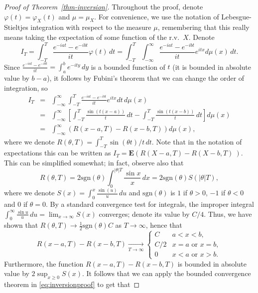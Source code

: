 \documentclass[12pt]{article}
\newcommand{\expec}{\mathbf{E}}
\theoremstyle{example}
\begin{document}
\begin{proof}[Proof of Theorem~\ref{thm-inversion}]
Throughout the proof, denote $\varphi(t)=\varphi_X(t)$ and $\mu=\mu_X$. For convenience, we use the notation of Lebesgue-Stieltjes integration with respect to the measure $\mu$, remembering that this really means taking the expectation of some function of the r.v.\ $X$. Denote
\begin{equation}\label{eq:inversionproof}
I_T = \int_{-T}^T \frac{e^{-i a t}-e^{-i b t}}{it} \varphi(t)\,dt
= \int_{-T}^T \int_{-\infty}^\infty \frac{e^{-i a t}-e^{-i b t}}{it} e^{itx}d\mu(x)\,dt.
\end{equation}
Since $\frac{e^{-i a t}-e^{-i b t}}{it} = \int_a^b e^{-i t y}\,dy$ is a bounded function of $t$ (it is bounded in absolute value by $b-a$), it follows by Fubini's theorem that we can change the order of integration, so
\begin{eqnarray*}
I_T&=& \int_{-\infty}^\infty \int_{-T}^T \frac{e^{-i a t}-e^{-i b t}}{it} e^{itx} dt\,d\mu(x) \\
&=&
\int_{-\infty}^\infty \left[ \int_{-T}^T \frac{\sin(t(x-a))}{t}\,dt-\int_{-T}^T \frac{\sin(t(x-b))}{t}\,dt \right]d\mu(x)
\\ &=& \int_{-\infty}^\infty \left( R(x-a,T)-R(x-b,T) \right) d\mu(x),
\end{eqnarray*}
where we denote $ R(\theta, T) = \int_{-T}^T \sin(\theta t)/t\,dt$. Note that in the notation of expectations this can be written as
$ I_T = \expec\left( R(X-a,T)-R(X-b,T)\ \right)$.
This can be simplified somewhat; in fact, observe also that
$$R(\theta,T)= 2\textrm{sgn}(\theta) \int_0^{|\theta|T} \frac{\sin x}{x}\,dx = 2 \textrm{sgn}(\theta) S(|\theta| T), $$
where we denote $S(x) = \int_0^x \frac{\sin(u)}{u}\,du$ and $\textrm{sgn}(\theta)$ is $1$ if $\theta>0$, $-1$ if $\theta<0$ and $0$ if $\theta=0$. By a standard convergence test for integrals, the improper integral $\int_0^\infty \frac{\sin u}{u}\,du = \lim_{x\to\infty}S(x)$ converges; denote its value by $C/4$. Thus, we have shown that $R(\theta,T)\to \frac12\textrm{sgn}(\theta) C$ as $T\to \infty$, hence that
$$ R(x-a,T)-R(x-b,T) \xrightarrow[T\to\infty]{} \begin{cases}
C & a<x<b, \\
C/2 & x=a\textrm{ or }x=b, \\
0 & x<a\textrm{ or }x>b.
\end{cases}
$$
Furthermore, the function $R(x-a,T)-R(x-b,T)$ is bounded in absolute value by $2\sup_{x\ge 0} S(x)$. It follows that we can apply the bounded convergence theorem in \eqref{eq:inversionproof} to get that

\end{proof}
\end{document}
